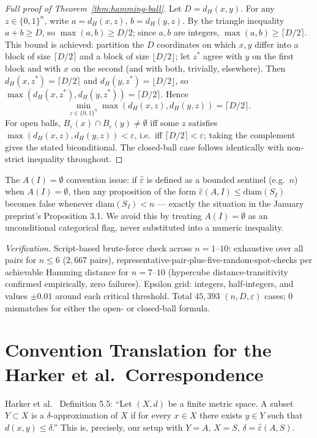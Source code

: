 \documentclass[11pt]{article}
\theoremstyle{definition}
\theoremstyle{remark}
\newcommand{\dH}{d_H}
\newcommand{\epshat}{\hat\varepsilon}
\begin{document}
\begin{proof}[Full proof of Theorem~\ref{thm:hamming-ball}]
Let $D = \dH(x,y)$. For any $z \in \{0,1\}^n$, write $a = \dH(x,z)$, $b=\dH(y,z)$. By the triangle inequality $a+b \ge D$, so $\max(a,b) \ge D/2$; since $a,b$ are integers, $\max(a,b) \ge \lceil D/2 \rceil$. This bound is achieved: partition the $D$ coordinates on which $x,y$ differ into a block of size $\lceil D/2 \rceil$ and a block of size $\lfloor D/2 \rfloor$; let $z^*$ agree with $y$ on the first block and with $x$ on the second (and with both, trivially, elsewhere). Then $\dH(x,z^*) = \lceil D/2 \rceil$ and $\dH(y,z^*) = \lfloor D/2 \rfloor$, so $\max(\dH(x,z^*),\dH(y,z^*)) = \lceil D/2 \rceil$. Hence
\[
\min_{z \in \{0,1\}^n} \max(\dH(x,z),\dH(y,z)) = \lceil D/2 \rceil.
\]
For open balls, $B_\varepsilon(x)\cap B_\varepsilon(y) \neq \emptyset$ iff some $z$ satisfies $\max(\dH(x,z),\dH(y,z)) < \varepsilon$, i.e.\ iff $\lceil D/2\rceil < \varepsilon$; taking the complement gives the stated biconditional. The closed-ball case follows identically with non-strict inequality throughout.
\end{proof}

The $A(I)=\emptyset$ convention issue: if $\epshat$ is defined as a bounded sentinel (e.g.\ $n$) when $A(I)=\emptyset$, then any proposition of the form $\epshat(A,I) \le \mathrm{diam}(S_I)$ becomes false whenever $\mathrm{diam}(S_I) < n$ --- exactly the situation in the January preprint's Proposition 3.1. We avoid this by treating $A(I)=\emptyset$ as an unconditional categorical flag, never substituted into a numeric inequality.

\emph{Verification.} Script-based brute-force check across $n=1$--$10$: exhaustive over all pairs for $n\le 6$ ($2{,}667$ pairs), representative-pair-plus-five-random-spot-checks per achievable Hamming distance for $n=7$--$10$ (hypercube distance-transitivity confirmed empirically, zero failures). Epsilon grid: integers, half-integers, and values $\pm 0.01$ around each critical threshold. Total $45{,}393$ $(n,D,\varepsilon)$ cases; $0$ mismatches for either the open- or closed-ball formula.

\section{Convention Translation for the Harker et al.\ Correspondence}
\label{app:harker}

Harker et al.\ \citep{harker2019comparison} Definition 5.5: ``Let $(X,d)$ be a finite metric space. A subset $Y \subset X$ is a $\delta$-approximation of $X$ if for every $x \in X$ there exists $y \in Y$ such that $d(x,y) \le \delta$.'' This is, precisely, our setup with $Y=A$, $X=S$, $\delta = \epshat(A,S)$.
\end{document}

